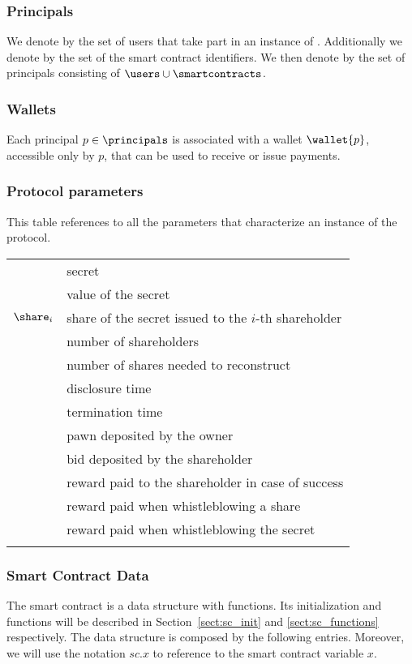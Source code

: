 \subsubsection*{Principals}
We denote by \users the set of users that take part in an instance of \shortname.
Additionally we denote by \smartcontracts the set of the smart contract identifiers.
We then denote by \principals the set of principals consisting of $\users \cup \smartcontracts$.

\medskip

\subsubsection*{Wallets}
Each principal $p \in \principals$ is associated with a wallet $\wallet{p}$, accessible only by $p$, that can be used to receive or issue payments.

\medskip

\subsubsection*{Protocol parameters}
This table references to all the parameters that characterize an instance of the \shortname protocol. \\

\begin{tabular}{ll}
	\secret & secret \\
	\V & value of the secret \\
	$\share_{i}$ & share of the secret issued to the $i$-th shareholder \\
	\N & number of shareholders \\
	\K & number of shares needed to reconstruct \secret \\	
	\td & disclosure time \\
	\te & termination time \\
	\PO & pawn deposited by the owner \\
	\BH & bid deposited by the shareholder \\
	\RH & reward paid to the shareholder in case of success \\
	\Wshare & reward paid when whistleblowing a share \\
	\Wsecret & reward paid when whistleblowing the secret \\

	& \\
\end{tabular}

\subsubsection*{Smart Contract Data}
The \shortname smart contract is a data structure with functions. 
Its initialization and functions will be described in Section~\ref{sect:sc_init} and \ref{sect:sc_functions} respectively. The data structure is composed by the following entries.
Moreover, we will use the notation $sc.x$ to reference to the smart contract variable $x$.

